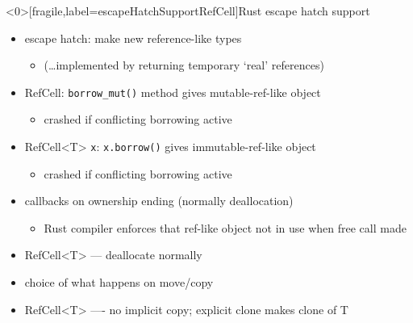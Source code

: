 \begin{frame}<0>[fragile,label=escapeHatchSupportRefCell]{Rust escape hatch support}
    \begin{itemize}
        \item escape hatch: make new reference-like types
            \begin{itemize}
            \item (\ldots implemented by returning temporary `real' references)
            \end{itemize}
        \item<2> RefCell: \verb|borrow_mut()| method gives mutable-ref-like object
            \begin{itemize}
            \item crashed if conflicting borrowing active
            \end{itemize}
        \item<2> RefCell<T> \verb|x|: \verb|x.borrow()| gives immutable-ref-like object
            \begin{itemize}
            \item crashed if conflicting borrowing active
            \end{itemize}
        \item callbacks on ownership ending (normally deallocation)
            \begin{itemize}
            \item Rust compiler enforces that ref-like object not in use when free call made
            \end{itemize}
        \item<2> RefCell<T> --- deallocate normally
        \item choice of what happens on move/copy
        \item<2> RefCell<T> ---- no implicit copy; explicit clone makes clone of T
    \end{itemize}
\end{frame}

